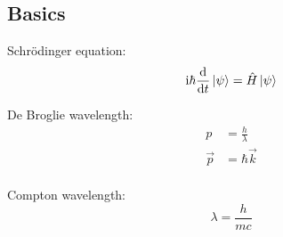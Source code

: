 
	\subsection{Basics}
		\noindent
		Schrödinger equation:
		\begin{equation}
			\mathrm{i}\hbar\frac{\mathrm{d} }{\mathrm{d} t}\Ket{\psi} = \hat{H}\Ket{\psi}
		\end{equation}

		\noindent
		De Broglie wavelength:
		\begin{equation}
			\begin{aligned}
				p &= \frac{h}{\lambda} \\
				\vec{p} &= \hbar \vec{k} \\
			\end{aligned}
		\end{equation}

		\noindent
		Compton wavelength:
		\begin{equation}
			\lambda = \frac{h}{mc}
		\end{equation}

